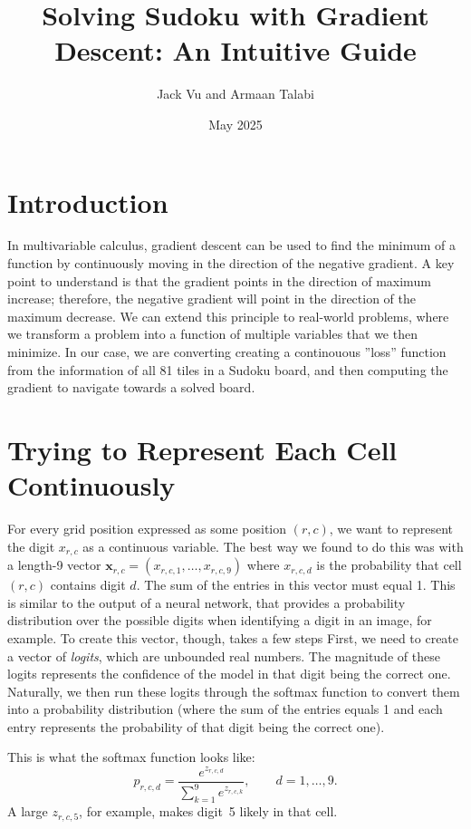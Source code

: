 \documentclass[12pt]{article}
\title{Solving Sudoku with Gradient Descent: An Intuitive Guide}
\author{Jack Vu and Armaan Talabi}
\date{May 2025}
\begin{document}
\maketitle

\section*{Introduction}

In multivariable calculus, gradient descent can be used to find the minimum of a function by continuously moving in the direction of the negative gradient. A key point to understand is that the gradient points in the direction of maximum increase; therefore, the negative gradient will point in the direction of the maximum decrease. We can extend this principle to real-world problems, where we transform a problem into a function of multiple variables that we then minimize.
In our case, we are converting creating a continouous ''loss'' function from the information of all 81 tiles in a Sudoku board, and then computing the gradient to navigate towards a solved board.
\section{Trying to Represent Each Cell Continuously}

For every grid position expressed as some position $(r,c)$, we want to represent the digit $x_{r,c}$ as a continuous variable. The best way we found to do this was with a length-9 vector $\mathbf x_{r,c}=(x_{r,c,1},\dots,x_{r,c,9})$ where $x_{r,c,d}$ is the probability that cell $(r,c)$ contains digit $d$. The sum of the entries in this vector must equal 1. This is similar to the output of a neural network, that provides a probability distribution over the possible digits when identifying a digit in an image, for example. 
To create this vector, though, takes a few steps
First, we need to create a vector of \textit{logits}, which are unbounded real numbers. The magnitude of these logits represents the confidence of the model in that digit being the correct one. Naturally, we then run these logits through the softmax function to convert them into a probability distribution (where the sum of the entries equals 1 and each entry represents the probability of that digit being the correct one).

This is what the softmax function looks like:
\begin{equation}
    p_{r,c,d} = \frac{e^{z_{r,c,d}}}{\sum_{k=1}^{9}e^{z_{r,c,k}}}, \qquad d=1,\dots,9.
\end{equation}
A large $z_{r,c,5}$, for example, makes digit~5 likely in that cell.
\end{document}
